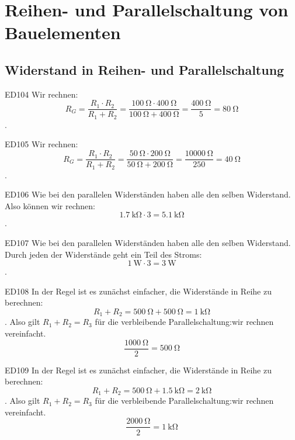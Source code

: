 \setcounter{section}{5}
\section{Reihen- und Parallelschaltung von Bauelementen}

\subsection{Widerstand in Reihen- und Parallelschaltung}

\begin{sol}{ED104}
Wir rechnen:   $$ R_G = \frac{R_1\cdot R_2}{R_1 + R_2}  = \frac{\SI{100}{\ohm}\cdot \SI{400}{\ohm}}{\SI{100}{\ohm} + \SI{400}{\ohm}}=\frac{\SI{400}{\ohm}}{5}=\SI{80}{\ohm} $$.
\end{sol}


\begin{sol}{ED105}
Wir rechnen:   $$ R_G = \frac{R_1\cdot R_2}{R_1 + R_2}  = \frac{\SI{50}{\ohm}\cdot \SI{200}{\ohm}}{\SI{50}{\ohm} + \SI{200}{\ohm}}=\frac{\SI{10000}{\ohm}}{250}=\SI{40}{\ohm} $$.
\end{sol}

\begin{sol}{ED106}
Wie bei den parallelen Widerständen haben alle den selben Widerstand. Also können wir rechnen:   $$ \SI{1.7}{\kilo\ohm}\cdot 3=\SI{5.1}{\kilo\ohm}$$.
\end{sol}

\begin{sol}{ED107}
Wie bei den parallelen Widerständen haben alle den selben Widerstand. Durch jeden der Widerstände geht ein Teil des Stroms:  
 $$ \SI{1}{\watt}\cdot 3=\SI{3}{\watt}$$.
\end{sol}

\begin{sol}{ED108}
In der Regel ist es zunächst einfacher, die Widerstände in Reihe zu berechnen: 
 $$ R_1 + R_2 = \SI{500}{\ohm} + \SI{500}{\ohm} = \SI{1}{\kilo\ohm} $$.
 Also gilt $R_1 + R_2 = R_3$ für die verbleibende  Parallelschaltung:wir rechnen vereinfacht.
 $$ \frac{\SI{1000}{\ohm}}{2} = \SI{500}{\ohm} $$ 
\end{sol}


\begin{sol}{ED109}
In der Regel ist es zunächst einfacher, die Widerstände in Reihe zu berechnen: 
 $$ R_1 + R_2 = \SI{500}{\ohm} + \SI{1,5}{\kilo\ohm} = \SI{2}{\kilo\ohm} $$.
 Also gilt $R_1 + R_2 = R_3$ für die verbleibende  Parallelschaltung:wir rechnen vereinfacht.
 $$ \frac{\SI{2000}{\ohm}}{2} = \SI{1}{\kilo\ohm} $$ 
\end{sol}

